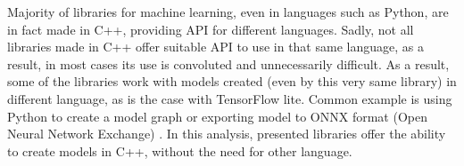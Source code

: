 Majority of libraries for machine learning, even in languages such as Python, are in fact made in C++, providing API for different languages. Sadly, not all libraries made in C++ offer suitable API to use in that same language, as a result, in most cases its use is convoluted and unnecessarily difficult. As a result, some of the libraries work with models created (even by this very same library) in different language, as is the case with TensorFlow lite. Common example is using Python to create a model graph or exporting model to ONNX format (Open Neural Network Exchange) \cite{cpp_onnx}. In this analysis, presented libraries offer the ability to create models in C++, without the need for other language. 